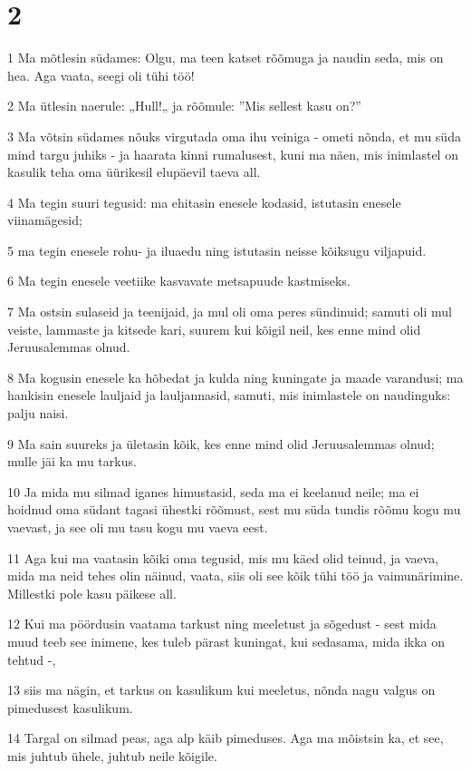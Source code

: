 \chapter{2}

\par 1 Ma mõtlesin südames: Olgu, ma teen katset rõõmuga ja naudin seda, mis on hea. Aga vaata, seegi oli tühi töö!
\par 2 Ma ütlesin naerule: „Hull!„ ja rõõmule: ”Mis sellest kasu on?”
\par 3 Ma võtsin südames nõuks virgutada oma ihu veiniga - ometi nõnda, et mu süda mind targu juhiks - ja haarata kinni rumalusest, kuni ma näen, mis inimlastel on kasulik teha oma üürikesil elupäevil taeva all.
\par 4 Ma tegin suuri tegusid: ma ehitasin enesele kodasid, istutasin enesele viinamägesid;
\par 5 ma tegin enesele rohu- ja iluaedu ning istutasin neisse kõiksugu viljapuid.
\par 6 Ma tegin enesele veetiike kasvavate metsapuude kastmiseks.
\par 7 Ma ostsin sulaseid ja teenijaid, ja mul oli oma peres sündinuid; samuti oli mul veiste, lammaste ja kitsede kari, suurem kui kõigil neil, kes enne mind olid Jeruusalemmas olnud.
\par 8 Ma kogusin enesele ka hõbedat ja kulda ning kuningate ja maade varandusi; ma hankisin enesele lauljaid ja lauljannasid, samuti, mis inimlastele on naudinguks: palju naisi.
\par 9 Ma sain suureks ja ületasin kõik, kes enne mind olid Jeruusalemmas olnud; mulle jäi ka mu tarkus.
\par 10 Ja mida mu silmad iganes himustasid, seda ma ei keelanud neile; ma ei hoidnud oma südant tagasi ühestki rõõmust, sest mu süda tundis rõõmu kogu mu vaevast, ja see oli mu tasu kogu mu vaeva eest.
\par 11 Aga kui ma vaatasin kõiki oma tegusid, mis mu käed olid teinud, ja vaeva, mida ma neid tehes olin näinud, vaata, siis oli see kõik tühi töö ja vaimunärimine. Millestki pole kasu päikese all.
\par 12 Kui ma pöördusin vaatama tarkust ning meeletust ja sõgedust - sest mida muud teeb see inimene, kes tuleb pärast kuningat, kui sedasama, mida ikka on tehtud -,
\par 13 siis ma nägin, et tarkus on kasulikum kui meeletus, nõnda nagu valgus on pimedusest kasulikum.
\par 14 Targal on silmad peas, aga alp käib pimeduses. Aga ma mõistsin ka, et see, mis juhtub ühele, juhtub neile kõigile.
